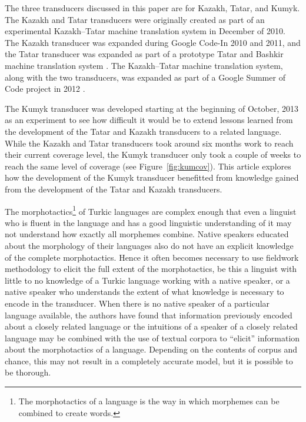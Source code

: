 \documentclass[a4paper,11pt,twocolumn]{article}
\begin{document}
The three transducers discussed in this paper are for Kazakh, Tatar, and Kumyk.  The Kazakh and Tatar transducers were originally created as part of an experimental Kazakh--Tatar machine translation system in December of 2010.  The Kazakh transducer was expanded during Google Code-In 2010 and 2011, and the Tatar transducer was expanded as part of a prototype Tatar and Bashkir machine translation system \citep{tyerswashingtonsalimzyanbattalov12}.  The Kazakh--Tatar machine translation system, along with the two transducers, was expanded as part of a Google Summer of Code project in 2012 \citep{salimzyanov2013}.

The Kumyk transducer was developed starting at the beginning of October, 2013 as an experiment to see how difficult it would be to extend lessons learned from the development of the Tatar and Kazakh transducers to a related language.  While the Kazakh and Tatar transducers took around six months work to reach their current coverage level, the Kumyk transducer only took a couple of weeks to reach the same level of coverage (see Figure~\ref{fig:kumcov}).  This article explores how the development of the Kumyk transducer benefitted from knowledge gained from the development of the Tatar and Kazakh transducers.

The morphotactics\footnote{The morphotactics of a language is the way in which morphemes can be combined to create words.} of Turkic languages are complex enough that even a linguist who is fluent in the language and has a good linguistic understanding of it may not understand how exactly all morphemes combine.  Native speakers educated about the morphology of their languages also do not have an explicit knowledge of the complete morphotactics.  Hence it often becomes necessary to use fieldwork methodology to elicit the full extent of the morphotactics, be this a linguist with little to no knowledge of a Turkic language working with a native speaker, or a native speaker who understands the extent of what knowledge is necessary to encode in the transducer.  When there is no native speaker of a particular language available, the authors have found that information previously encoded about a closely related language or the intuitions of a speaker of a closely related language may be combined with the use of textual corpora to ``elicit'' information about the morphotactics of a language.  Depending on the contents of corpus and chance, this may not result in a completely accurate model, but it is possible to be thorough.
\end{document}
